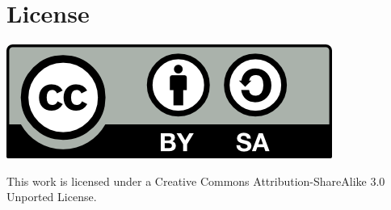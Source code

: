 \chapter{License}

\includegraphics[scale=1.0]{creative_commons}

This work is licensed under a Creative Commons Attribution-ShareAlike
3.0 Unported License.
